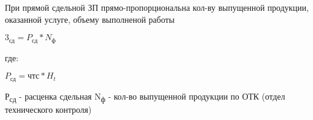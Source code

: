\documentclass[11pt]{article}
\begin{document}
При прямой сдельной ЗП прямо-пропорциональна кол-ву выпущенной продукции, оказанной услуге, объему выполненой работы \\

\newline


\begin{math}
3_{\text{сд}} = P_{\text{сд}} * N_{\text{ф}}
\end{math}

где:

\newline
\begin{math}
  P_{\text{сд}} = \text{чтс} * H_{t}
\end{math}
\newline\newline


Р\textsubscript{сд} - расценка сдельная
N\textsubscript{ф} - кол-во выпущенной продукции по ОТК (отдел технического контроля)
\end{document}
